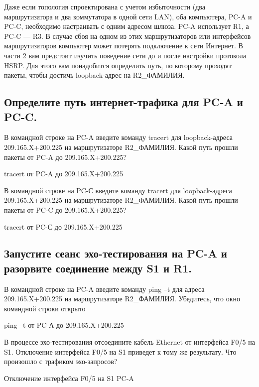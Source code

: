 Даже если топология спроектирована с учетом избыточности (два маршрутизатора и два коммутатора
в одной сети LAN), оба компьютера, PC-A и PC-C, необходимо настраивать с одним адресом шлюза.
PC-A использует R1, а PC-C — R3. В случае сбоя на одном из этих маршрутизаторов или интерфейсов
маршрутизаторов компьютер может потерять подключение к сети Интернет.
В части 2 вам предстоит изучить поведение сети до и после настройки протокола HSRP. Для этого вам
понадобится определить путь, по которому проходят пакеты, чтобы достичь loopback-адрес на
R2\_ФАМИЛИЯ.

\subsection{Определите путь интернет-трафика для PC-A и PC-C.}
В командной строке на PC-A введите команду tracert для loopback-адреса 209.165.X+200.225
на маршрутизаторе R2\_ФАМИЛИЯ.
Какой путь прошли пакеты от PC-A до 209.165.X+200.225?

\begin{image}
    \caption{tracert от PC-A до 209.165.X+200.225 }
\end{image}

В командной строке на PC-С введите команду tracert для loopback-адреса 209.165.X+200.225
на маршрутизаторе R2\_ФАМИЛИЯ.
Какой путь прошли пакеты от PC-C до 209.165.X+200.225?
\begin{image}
    \caption{tracert от PC-С до 209.165.X+200.225 }
\end{image}

\subsection{Запустите сеанс эхо-тестирования на PC-A и разорвите соединение между S1 и R1.}
В командной строке на PC-A введите команду ping –t для адреса 209.165.X+200.225
на маршрутизаторе R2\_ФАМИЛИЯ. Убедитесь, что окно командной строки открыто

\begin{image}
    \caption{ping –t от PC-А до 209.165.X+200.225 }
\end{image}

В процессе эхо-тестирования отсоедините кабель Ethernet от интерфейса F0/5 на S1.
Отключение интерфейса F0/5 на S1 приведет к тому же результату.
Что произошло с трафиком эхо-запросов?

\begin{image}
    \caption{Отключение интерфейса F0/5 на S1 PC-A}
\end{image}

